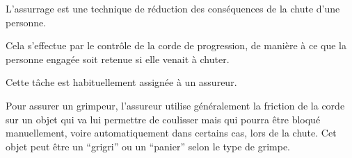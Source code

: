 \documentclass[a4paper,10pt,french]{scrartcl}
\begin{document}
L'assurrage est une technique de réduction des conséquences de la chute d'une personne.


Cela s'effectue par le contrôle de la corde de progression, de manière à ce que la personne engagée soit retenue si elle venait à chuter.

Cette tâche est habituellement assignée à un assureur.

Pour assurer un grimpeur, l'assureur utilise généralement la friction de la corde sur un objet qui va lui permettre de coulisser mais qui pourra être bloqué manuellement, voire automatiquement dans certains cas, lors de la chute. Cet objet peut \^etre un ``grigri'' ou un ``panier'' selon le type de grimpe.






%
%
%
%

%
%
%
%
%
\end{document}

